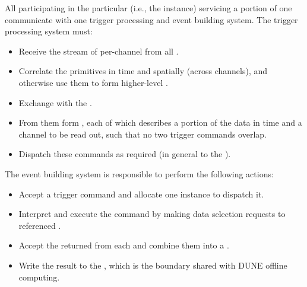 All participating  in the particular 
(i.e., the  instance) servicing a portion of one 
communicate with one trigger processing and event building system.
The trigger processing system must:
\begin{itemize}
\item Receive the stream of per-channel  from all .
\item Correlate the primitives in time and spatially (across channels), and otherwise use them to form higher-level .
\item Exchange  with the .
\item From them form , each of which describes a
  portion of the data in time and a channel to be read out, such that
  no two trigger commands overlap.
\item Dispatch these commands as required (in general to the ).
\end{itemize}
The event building system is responsible to perform the following actions:
\begin{itemize}
\item Accept a trigger command and allocate one  instance to dispatch it.
\item %
Interpret and execute the command by making
  data selection requests to referenced .
\item %
Accept the returned  from each
   and combine them into a .
\item Write the result to the , which is the boundary
  shared with DUNE offline computing.
\end{itemize}

